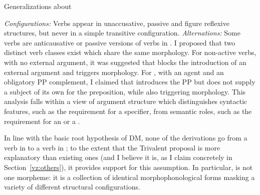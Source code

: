 \begin{exe}
\begin{xlist}
\begin{xlist}
\begin{exe}
\begin{xlist}
\begin{xlist}
\begin{exe}
\begin{xlist}
\begin{xlist}
\begin{exe}
\begin{exe}
\begin{xlist}
\begin{exe}
\begin{exe}
\begin{xlist}
\begin{exe}
\begin{exe}
\begin{exe}
\begin{exe}
\begin{exe}
\begin{xlist}
\begin{exe}
\begin{xlist}
\begin{exe}
\begin{exe}
\begin{xlist}
\begin{exe}
\begin{xlist}
\begin{exe}
\begin{xlist}
\begin{exe}
\begin{exe}
\begin{exe}
\begin{xlist}
\begin{exe}
\begin{exe}
\begin{exe}
\begin{xlist}
\begin{exe}
\begin{xlist}
\begin{exe}
\begin{exe}
\begin{xlist}
\begin{exe}
\begin{exe}
\begin{exe}
\begin{exe}
\begin{xlist}
\begin{exe}
\begin{xlist}
\begin{exe}
\begin{xlist}
\begin{exe}
\begin{xlist}
\begin{exe}
\begin{xlist}
\begin{exe}
\begin{xlist}
\begin{exe}
\begin{exe}
\begin{xlist}
\begin{exe}
\begin{xlist}
\begin{exe}
 \begin{exe}
 \ex  \label{ex:gen-tnif2}Generalizations about {\tnif}
 \begin{xlist} 
 	\ex  \textit{Configurations:} Verbs appear in unaccusative, passive and figure reflexive structures, but never in a simple transitive configuration. 
 	\ex  \textit{Alternations:} Some verbs are anticausative or passive versions of verbs in {\tkal}. 
 \z
\z 
I proposed that two distinct verb classes exist which share the same morphology. For non-active verbs, with no external argument, it was suggested that {\vz} blocks the introduction of an external argument and triggers {\tnif} morphology. For , with an agent and an obligatory PP complement, I claimed that {\pz} introduces the PP but does not supply a subject of its own for the preposition, while also triggering {\tnif} morphology. This analysis falls within a view of argument structure which distinguishes syntactic features, such as the requirement for a specifier, from semantic roles, such as the requirement for an  or a .

In line with the basic root hypothesis of DM, none of the derivations go from a verb in {\tkal} to a verb in {\tnif}; to the extent that the Trivalent proposal is more explanatory than existing ones (and I believe it is, as I claim concretely in Section~\ref{vz:others}), it provides support for this assumption. In particular, {\tnif} is not one morpheme: it is a collection of identical morphophonological forms masking a variety of different structural configurations.


\end{xlist}
\end{exe}
\end{exe}
\end{xlist}
\end{exe}
\end{xlist}
\end{exe}
\end{exe}
\end{xlist}
\end{exe}
\end{xlist}
\end{exe}
\end{xlist}
\end{exe}
\end{xlist}
\end{exe}
\end{xlist}
\end{exe}
\end{xlist}
\end{exe}
\end{exe}
\end{exe}
\end{exe}
\end{xlist}
\end{exe}
\end{exe}
\end{xlist}
\end{exe}
\end{xlist}
\end{exe}
\end{exe}
\end{exe}
\end{xlist}
\end{exe}
\end{exe}
\end{exe}
\end{xlist}
\end{exe}
\end{xlist}
\end{exe}
\end{xlist}
\end{exe}
\end{exe}
\end{xlist}
\end{exe}
\end{xlist}
\end{exe}
\end{exe}
\end{exe}
\end{exe}
\end{exe}
\end{xlist}
\end{exe}
\end{exe}
\end{xlist}
\end{exe}
\end{exe}
\end{xlist}
\end{xlist}
\end{exe}
\end{xlist}
\end{xlist}
\end{exe}
\end{xlist}
\end{xlist}
\end{exe}
